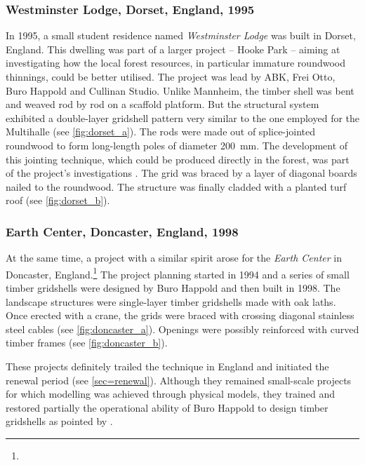 \subsubsection{Westminster Lodge, Dorset, England, 1995}
In 1995, a small student residence named \emph{Westminster Lodge} was built in Dorset, England. This dwelling was part of a larger project -- Hooke Park -- aiming at investigating how the local forest resources, in particular immature roundwood thinnings, could be better utilised. The project was lead by ABK, Frei Otto, Buro Happold and Cullinan Studio. Unlike Mannheim, the timber shell was bent and weaved rod by rod on a scaffold platform. But the structural system exhibited a double-layer gridshell pattern very similar to the one employed for the Multihalle (see \cref{fig:dorset_a}). The rods were made out of splice-jointed roundwood to form long-length poles of diameter \SI{200}{mm}. The development of this jointing technique, which could be produced directly in the forest, was part of the project's investigations \cite{Burton1998}. The grid was braced by a layer of diagonal boards nailed to the roundwood. The structure was finally cladded with a planted turf roof (see \cref{fig:dorset_b}).

\subsubsection{Earth Center, Doncaster, England, 1998}
At the same time, a project with a similar spirit arose for the \emph{Earth Center} in Doncaster, England.\footnote{} The project planning started in 1994 and a series of small timber gridshells were designed by Buro Happold and then built in 1998. The landscape structures were single-layer timber gridshells made with oak laths. Once erected with a crane, the grids were braced with crossing diagonal stainless steel cables (see \cref{fig:doncaster_a}). Openings were possibly reinforced with curved timber frames (see \cref{fig:doncaster_b}).

These projects definitely trailed the technique in England and initiated the renewal period (see \cref{sec=renewal}). Although they remained small-scale projects for which modelling was achieved through physical models, they trained and restored partially the operational ability of Buro Happold to design timber gridshells as pointed by \citet{Harris2003}.

